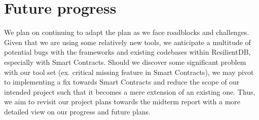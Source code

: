 \section{Future progress}
We plan on continuing to adapt the plan as we face roadblocks and challenges.
Given that we are using some relatively new tools, we anticipate a multitude of potential bugs with
the frameworks and existing codebases within ResilientDB, especially with Smart Contracts.
Should we discover some significant problem with our tool set (ex. critical missing feature in Smart
Contracts), we may pivot to implementing a fix towards Smart Contracts and reduce the scope of our
intended project such that it becomes a mere extension of an existing one.
Thus, we aim to revisit our project plans towards the midterm report with a more detailed view on
our progress and future plans. 
